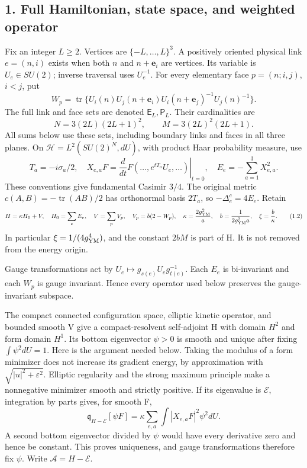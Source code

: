 \documentclass[
  11pt,
]{article}
\begin{document}
\subsection{1. Full Hamiltonian, state space, and weighted
operator}\label{magnetic-part-3-full-hamiltonian-state-space-and-weighted-operator}

Fix an integer \(L\ge2\). Vertices are \(\{-L,\ldots,L\}^3\). A
positively oriented physical link \(e=(n,i)\) exists when both \(n\) and
\(n+\mathbf e_i\) are vertices. Its variable is \(U_e\in SU(2)\);
inverse traversal uses \(U_e^{-1}\). For every elementary face
\(p=(n;i,j)\), \(i<j\), put \[
 W_p=\operatorname{tr}\{U_i(n)U_j(n+\mathbf e_i)
                  U_i(n+\mathbf e_j)^{-1}U_j(n)^{-1}\}.
\tag{1.1}
\] The full link and face sets are denoted \(\mathsf E_L,\mathsf P_L\).
Their cardinalities are \[
 N=3(2L)(2L+1)^2,\qquad M=3(2L)^2(2L+1).
\] All sums below use these sets, including boundary links and faces in
all three planes. On \(\mathcal H=L^2(SU(2)^N,dU)\), with product Haar
probability measure, use \[
 T_a=-i\sigma_a/2,\quad
 X_{e,a}F=\left.\frac{d}{dt}F(\ldots,e^{tT_a}U_e,\ldots)\right|_{t=0},
 \quad E_e=-\sum_{a=1}^3X_{e,a}^2.
\] These conventions give fundamental Casimir \(3/4\). The original
metric \(c(A,B)=-\operatorname{tr}(AB)/2\) has orthonormal basis
\(2T_a\), so \(-\Delta_e^c=4E_e\). Retain \[
 H=\kappa H_0+V,\quad H_0=\sum_e E_e,\quad
 V=\sum_p V_p,\quad V_p=b(2-W_p),
 \quad \kappa=\frac{2g_{\rm YM}^2}{a},\quad
 b=\frac{1}{2g_{\rm YM}^2a},\quad \xi=\frac b\kappa.
\tag{1.2}
\] In particular \(\xi=1/(4g_{\rm YM}^4)\), and the constant \(2bM\) is
part of H. It is not removed from the energy origin.

Gauge transformations act by \(U_e\mapsto g_{s(e)}U_eg_{t(e)}^{-1}\).
Each \(E_e\) is bi-invariant and each \(W_p\) is gauge invariant. Hence
every operator used below preserves the gauge-invariant subspace.

The compact connected configuration space, elliptic kinetic operator,
and bounded smooth V give a compact-resolvent self-adjoint H with domain
\(H^2\) and form domain \(H^1\). Its bottom eigenvector \(\psi>0\) is
smooth and unique after fixing \(\int\psi^2dU=1\). Here is the argument
needed below. Taking the modulus of a form minimizer does not increase
its gradient energy, by approximation with
\(\sqrt{|u|^2+\varepsilon^2}\). Elliptic regularity and the strong
maximum principle make a nonnegative minimizer smooth and strictly
positive. If its eigenvalue is \(\mathcal E\), integration by parts
gives, for smooth F, \[
 \mathfrak q_{H-\mathcal E}[\psi F]
 =\kappa\sum_{e,a}\int |X_{e,a}F|^2\psi^2dU.
\tag{1.3}
\] A second bottom eigenvector divided by \(\psi\) would have every
derivative zero and hence be constant. This proves uniqueness, and gauge
transformations therefore fix \(\psi\). Write
\(\mathcal A=H-\mathcal E\).
\end{document}
